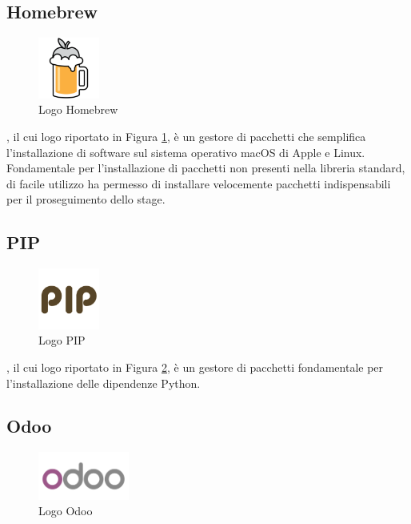 \subsection{Homebrew}
\begin{figure}[H]
	\begin{center} \includegraphics[width=2cm]{figures/homebrew}
		\caption[Logo Homebrew]{Logo Homebrew}
		\label{logo_homebrew} 
	\end{center}
\end{figure}
, il cui logo riportato in Figura \ref{logo_homebrew}, è un gestore di pacchetti  che semplifica l'installazione di software sul sistema operativo macOS di Apple e Linux. Fondamentale per l'installazione di pacchetti non presenti nella libreria standard, di facile utilizzo ha permesso di installare velocemente pacchetti indispensabili per il proseguimento dello stage.


\subsection{PIP}
\begin{figure}[H]
	\begin{center} \includegraphics[width=2cm]{figures/pip}
		\caption[Logo Pip]{Logo PIP}
		\label{logo_pip} 
	\end{center}
\end{figure}
, il cui logo riportato in Figura \ref{logo_pip}, è un gestore di pacchetti fondamentale per l’installazione delle dipendenze Python.
\newpage

\subsection{Odoo}
\begin{figure}[H]
	\begin{center} \includegraphics[width=3cm]{figures/logo_odoo}
		\caption[Logo Odoo]{Logo Odoo}
		\label{logo_odoo} 
	\end{center}
\end{figure}

